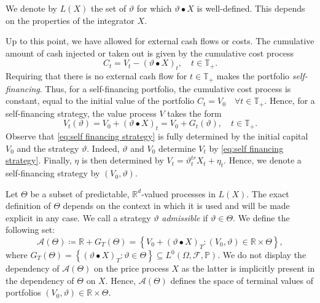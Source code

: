 \documentclass[11pt,a4paper,twoside,openany]{report}
\numberwithin{equation}{section}
\theoremstyle{plain} %
\theoremstyle{definition} %
\theoremstyle{remark} %
\begin{document}
We denote by \(L(X)\) the set of \(\vartheta\) for which \(\vartheta\bullet X\) is well-defined. This depends on the properties of the integrator \(X\).


Up to this point, we have allowed for external cash flows or costs. The cumulative amount of cash injected or taken out is given by the cumulative cost process 
\begin{equation*}
    C_t = V_t - (\vartheta \bullet X)_t,\quad t\in\mathbb{T}_+. 
\end{equation*}
Requiring that there is no external cash flow for \(t\in \mathbb{T}_+\) makes the portfolio \textit{self-financing}. Thus, for a self-financing portfolio, the cumulative cost process is constant, equal to the initial value of the  portfolio \(C_t=V_0\quad\forall t\in \mathbb{T}_+\). Hence, for a self-financing strategy, the value process \(V\) takes the form
\begin{equation}\label{eq:self financing strategy}
    V_t(\vartheta) = V_0 + (\vartheta\bullet X)_t=V_0+G_t(\vartheta),\quad t\in\mathbb{T}_+. 
\end{equation}
Observe that \eqref{eq:self financing strategy} is fully determined by the initial capital \(V_0\) and the strategy \(\vartheta\). Indeed, \(\vartheta\) and \(V_0\) determine \(V_t\) by  \eqref{eq:self financing strategy}. Finally, \(\eta\) is then determined by \(V_t = \vartheta_t^{tr}X_t+\eta_t\). Hence, we denote a self-financing strategy by \((V_0,\vartheta)\).


Let \(\Theta\) be a subset of predictable, \(\mathbb{R}^d\)-valued processes in \(L(X)\). 
The exact definition of \(\Theta\) depends on the context in which it is used and will be made explicit in any case.
We call a strategy \(\vartheta\) \textit{admissible} if \(\vartheta\in\Theta\). 
We define the following set:
\begin{equation}\label{eq:terminal value processes}
    \mathcal{A}(\Theta)\coloneqq \mathbb{R}+G_T(\Theta)=\left\{V_0+(\vartheta \bullet X)_T:(V_0,\vartheta)\in\mathbb{R}\times \Theta\right\},
\end{equation}
where \(G_T(\Theta)=\left\{(\vartheta \bullet X)_T:\vartheta\in \Theta\right\}\subseteq L^0(\Omega,\mathcal{F},\mathbb{P})\). We do not display the dependency of \(\mathcal{A}(\Theta)\) on the price process \(X\) as the latter is implicitly present in the dependency of \(\Theta\) on \(X\).
Hence, \(\mathcal{A}(\Theta)\) defines the space of terminal values of portfolios \((V_0,\vartheta)\in\mathbb{R}\times \Theta\). 
\end{document}
